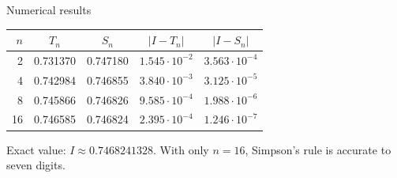 \documentclass[aspectratio=169,11pt]{beamer}
\begin{document}
\begin{frame}{Numerical results}
  \centering
  \renewcommand{\arraystretch}{1.25}
  \begin{tabular}{r c c c c}
    \toprule
    \rowcolor{navy!8} $n$ & $T_n$ & $S_n$ & $\lvert I-T_n\rvert$ & $\lvert I-S_n\rvert$ \\
    \midrule
     2 & 0.731370 & 0.747180 & $1.545\cdot10^{-2}$ & $3.563\cdot10^{-4}$ \\
     4 & 0.742984 & 0.746855 & $3.840\cdot10^{-3}$ & $3.125\cdot10^{-5}$ \\
     8 & 0.745866 & 0.746826 & $9.585\cdot10^{-4}$ & $1.988\cdot10^{-6}$ \\
    \rowcolor{tealc!12}
    16 & 0.746585 & 0.746824 & $2.395\cdot10^{-4}$ & $1.246\cdot10^{-7}$ \\
    \bottomrule
  \end{tabular}

  \vspace{1em}
  \begin{minipage}{0.8\textwidth}\centering
    Exact value: $I\approx 0.7468241328$. With only $n=16$, Simpson's rule is accurate to seven digits.
  \end{minipage}
\end{frame}
\end{document}
